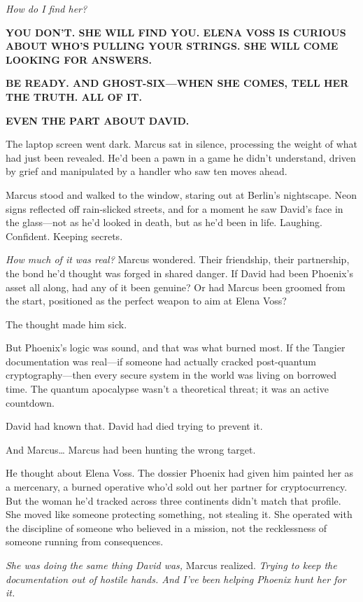 \emph{How do I find her?}

\textbf{YOU DON'T. SHE WILL FIND YOU. ELENA VOSS IS CURIOUS ABOUT WHO'S PULLING YOUR STRINGS. SHE WILL COME LOOKING FOR ANSWERS.}

\textbf{BE READY. AND GHOST-SIX---WHEN SHE COMES, TELL HER THE TRUTH. ALL OF IT.}

\textbf{EVEN THE PART ABOUT DAVID.}

The laptop screen went dark. Marcus sat in silence, processing the weight of what had just been revealed. He'd been a pawn in a game he didn't understand, driven by grief and manipulated by a handler who saw ten moves ahead.

Marcus stood and walked to the window, staring out at Berlin's nightscape. Neon signs reflected off rain-slicked streets, and for a moment he saw David's face in the glass---not as he'd looked in death, but as he'd been in life. Laughing. Confident. Keeping secrets.

\emph{How much of it was real?} Marcus wondered. Their friendship, their partnership, the bond he'd thought was forged in shared danger. If David had been Phoenix's asset all along, had any of it been genuine? Or had Marcus been groomed from the start, positioned as the perfect weapon to aim at Elena Voss?

The thought made him sick.

But Phoenix's logic was sound, and that was what burned most. If the Tangier documentation was real---if someone had actually cracked post-quantum cryptography---then every secure system in the world was living on borrowed time. The quantum apocalypse wasn't a theoretical threat; it was an active countdown.

David had known that. David had died trying to prevent it.

And Marcus\ldots{} Marcus had been hunting the wrong target.

He thought about Elena Voss. The dossier Phoenix had given him painted her as a mercenary, a burned operative who'd sold out her partner for cryptocurrency. But the woman he'd tracked across three continents didn't match that profile. She moved like someone protecting something, not stealing it. She operated with the discipline of someone who believed in a mission, not the recklessness of someone running from consequences.

\emph{She was doing the same thing David was,} Marcus realized. \emph{Trying to keep the documentation out of hostile hands. And I've been helping Phoenix hunt her for it.}

